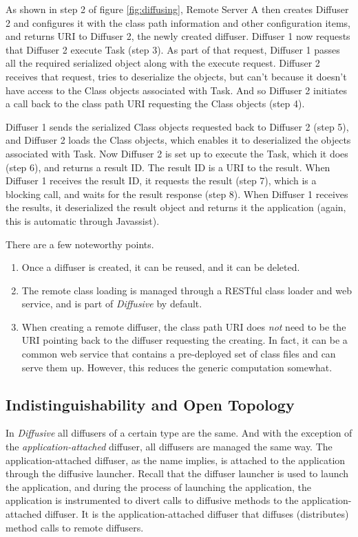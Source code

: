 \documentclass[11pt]{article}
\begin{document}
As shown in step 2 of figure \ref{fig:diffusing}, \textsf{Remote Server A} then creates \textsf{Diffuser 2} and configures it with the class path information and other configuration items, and returns URI to \textsf{Diffuser 2}, the newly created diffuser. \textsf{Diffuser 1} now requests that \textsf{Diffuser 2} execute \textsf{Task} (step 3). As part of that request, \textsf{Diffuser 1} passes all the required serialized object along with the execute request. \textsf{Diffuser 2} receives that request, tries to deserialize the objects, but can't because it doesn't have access to the \textsf{Class} objects associated with \textsf{Task}. And so \textsf{Diffuser 2} initiates a call back to the class path URI requesting the \textsf{Class} objects (step 4).

\textsf{Diffuser 1} sends the serialized \textsf{Class} objects requested back to \textsf{Diffuser 2} (step 5), and \textsf{Diffuser 2} loads the \textsf{Class} objects, which enables it to deserialized the objects associated with \textsf{Task}. Now \textsf{Diffuser 2} is set up to execute the \textsf{Task}, which it does (step 6), and returns a result ID. The result ID is a URI to the result. When \textsf{Diffuser 1} receives the result ID, it requests the result (step 7), which is a blocking call, and waits for the result response (step 8). When \textsf{Diffuser 1} receives the results, it deserialized the result object and returns it the application (again, this is automatic through Javassist).

There are a few noteworthy points. 
\begin{enumerate}
\item Once a diffuser is created, it can be reused, and it can be deleted.
\item The remote class loading is managed through a RESTful class loader and web service, and is part of \emph{Diffusive} by default.
\item When creating a remote diffuser, the class path URI does \emph{not} need to be the URI pointing back to the diffuser requesting the creating. In fact, it can be a common web service that contains a pre-deployed set of class files and can serve them up. However, this reduces the generic computation somewhat.
\end{enumerate}

\subsection{Indistinguishability and Open Topology\label{sec:indistinguishability_and_open_topology}}
In \emph{Diffusive} all diffusers of a certain type are the same. And with the exception of the \emph{application-attached} diffuser, all diffusers are managed the same way. The application-attached diffuser, as the name implies, is attached to the application through the diffusive launcher. Recall that the diffuser launcher is used to launch the application, and during the process of launching the application, the application is instrumented to divert calls to diffusive methods to the application-attached diffuser. It is the application-attached diffuser that diffuses (distributes) method calls to remote diffusers.
\end{document}
